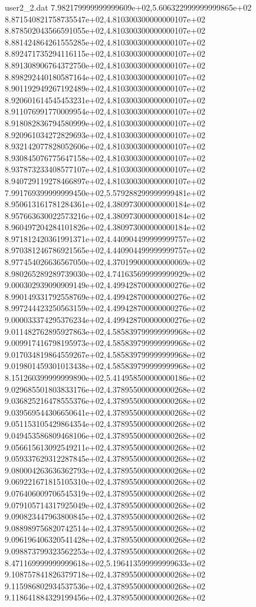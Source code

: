 \begin{filecontents}{user2_2.dat}
7.982179999999999609e+02,5.606322999999999865e+02
8.871540821758735547e+02,4.810300300000000107e+02
8.878502043566591055e+02,4.810300300000000107e+02
8.881424864261555285e+02,4.810300300000000107e+02
8.892471735294116115e+02,4.810300300000000107e+02
8.891308906764372750e+02,4.810300300000000107e+02
8.898292440180587164e+02,4.810300300000000107e+02
8.901192949267192489e+02,4.810300300000000107e+02
8.920601614545453231e+02,4.810300300000000107e+02
8.911076991770009954e+02,4.810300300000000107e+02
8.918082836794580999e+02,4.810300300000000107e+02
8.920961034272829693e+02,4.810300300000000107e+02
8.932142077828052606e+02,4.810300300000000107e+02
8.930845076775647158e+02,4.810300300000000107e+02
8.937873233408577107e+02,4.810300300000000107e+02
8.940729119278466897e+02,4.810300300000000107e+02
7.991769399999999450e+02,5.579288299999999481e+02
8.950613161781284361e+02,4.380973000000000184e+02
8.957663630022573216e+02,4.380973000000000184e+02
8.960497204284101826e+02,4.380973000000000184e+02
8.971812420361991371e+02,4.440904499999999757e+02
8.970381246786921565e+02,4.440904499999999757e+02
8.977454026636567050e+02,4.370199000000000069e+02
8.980265289289739030e+02,4.741635699999999929e+02
9.000302939090909149e+02,4.499428700000000276e+02
8.990149331792558769e+02,4.499428700000000276e+02
8.997244423250563159e+02,4.499428700000000276e+02
9.000033374295376234e+02,4.499428700000000276e+02
9.011482762895927863e+02,4.585839799999999968e+02
9.009917416798195973e+02,4.585839799999999968e+02
9.017034819864559267e+02,4.585839799999999968e+02
9.019801459301013438e+02,4.585839799999999968e+02
8.151260399999999890e+02,5.414958500000000186e+02
9.029685501803833176e+02,4.378955000000000268e+02
9.036825216478555376e+02,4.378955000000000268e+02
9.039569544306650641e+02,4.378955000000000268e+02
9.051153105429864354e+02,4.378955000000000268e+02
9.049453586809468106e+02,4.378955000000000268e+02
9.056615613092549211e+02,4.378955000000000268e+02
9.059337629312287845e+02,4.378955000000000268e+02
9.080004263636362793e+02,4.378955000000000268e+02
9.069221671815105310e+02,4.378955000000000268e+02
9.076406009706545319e+02,4.378955000000000268e+02
9.079105714317925049e+02,4.378955000000000268e+02
9.090823447963800845e+02,4.378955000000000268e+02
9.088989756820742514e+02,4.378955000000000268e+02
9.096196406320541428e+02,4.378955000000000268e+02
9.098873799323562253e+02,4.378955000000000268e+02
8.471169999999999618e+02,5.196413599999999633e+02
9.108757841826379718e+02,4.378955000000000268e+02
9.115986802934537536e+02,4.378955000000000268e+02
9.118641884329199456e+02,4.378955000000000268e+02

\end{filecontents}
